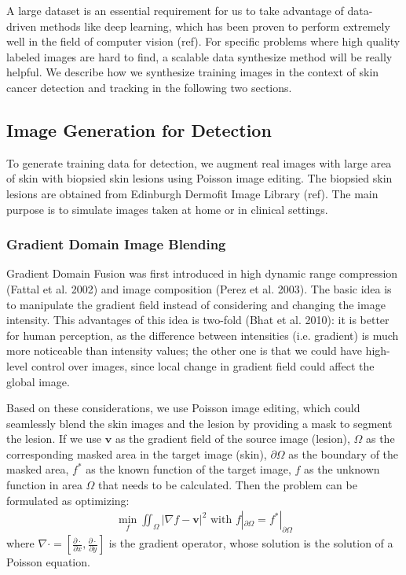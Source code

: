\documentclass[letterpaper]{article}
\begin{document}
A large dataset is an essential requirement for us to take advantage of data-driven methods like deep learning, which has been proven to perform extremely well in the field of computer vision (ref). For specific problems where high quality labeled images are hard to find, a scalable data synthesize method will be really helpful. We describe how we synthesize training images in the context of skin cancer detection and tracking in the following two sections.

\subsection{Image Generation for Detection}

To generate training data for detection, we augment real images with large area of skin with biopsied skin lesions using Poisson image editing. The biopsied skin lesions are obtained from Edinburgh Dermofit Image Library (ref). The main purpose is to simulate images taken at home or in clinical settings.

\subsubsection{Gradient Domain Image Blending}

Gradient Domain Fusion was first introduced in high dynamic range compression (Fattal et al. 2002) and image composition (Perez et al. 2003). The basic idea is to manipulate the gradient field instead of considering and changing the image intensity. This advantages of this idea is two-fold (Bhat et al. 2010): it is better for human perception, as the difference between intensities (i.e. gradient) is much more noticeable than intensity values; the other one is that we could have high-level control over images, since local change in gradient field could affect the global image.

Based on these considerations, we use Poisson image editing, which could seamlessly blend the skin images and the lesion by providing a mask to segment the lesion. If we use $\mathbf{v}$ as the gradient field of the source image (lesion), $\Omega$ as the corresponding masked area in the target image (skin), $\partial\Omega$ as the boundary of the masked area, $f^*$ as the known function of the target image, $f$ as the unknown function in area $\Omega$ that needs to be calculated. Then the problem can be formulated as optimizing:
\begin{align}
  \min_f \iint_\Omega |\nabla f - \mathbf{v}|^2 \text{ with } f|_{\partial\Omega} = f^*|_{\partial\Omega}
  \label{eqn:poisson}
\end{align}
where $\nabla\cdot = [\frac{\partial\cdot}{\partial x},\frac{\partial\cdot}{\partial y}]$ is the gradient operator, whose solution is the solution of a Poisson equation.
\end{document}

